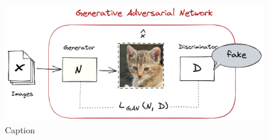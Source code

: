 
\begin{figure}[H]
    \centering
    \includegraphics[width=0.9\linewidth]{concept_engineering/vqgan/vqgan_gan_inside.png}
    \caption{Caption}
    \label{fig:gan}
\end{figure}

